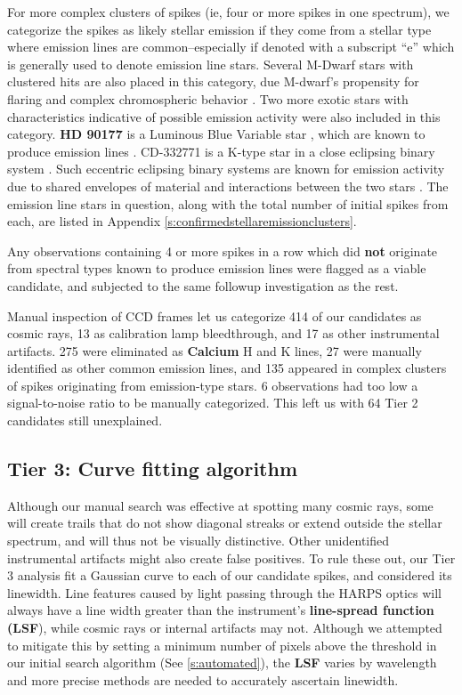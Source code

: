 \documentclass[linenumbers]{aastex701}
\providecommand{\DIFadd}[1]{{\bf #1}} %
\providecommand{\DIFaddbegin}{} %
\providecommand{\DIFaddend}{} %
\begin{document}
For more complex clusters of spikes (ie, four or more spikes in one spectrum), we categorize the spikes as likely stellar emission if they come from a stellar type where emission lines are common--especially if denoted with a subscript  \DIFaddbegin \enquote{e} \DIFaddend which is generally used to denote emission line stars. Several M-Dwarf stars with clustered hits are also placed in this category, due M-dwarf's propensity for flaring and complex chromospheric behavior \citep{ProximaCentauri}. Two more exotic stars with characteristics indicative of possible emission activity were also included in this category.  \DIFaddbegin \DIFadd{HD 90177 }\DIFaddend is a Luminous Blue Variable star \citep{LBV2}, which are known to produce emission lines \citep{LBV}. CD-332771 is a K-type star in a close eclipsing binary system \citep{CD332771EmissionLinesEclipsingBinaries}. Such eccentric eclipsing binary systems are known for emission activity due to shared envelopes of material and interactions between the two stars \citep{eclipsing_binaries}. The emission line stars in question, along with the total number of initial spikes from each, are listed in Appendix \ref{s:confirmedstellaremissionclusters}.

Any observations containing 4 or more spikes in a row which did \textbf{not} originate from spectral types known to produce emission lines were flagged as a viable candidate, and subjected to the same followup investigation as the rest. 

Manual inspection of CCD frames let us categorize 414 of our candidates as cosmic rays, 13 as calibration lamp bleedthrough, and 17 as other instrumental artifacts.  275 were eliminated as \DIFaddbegin \DIFadd{Calcium }\DIFaddend H and K lines, 27 were manually identified as other common emission lines, and 135 appeared in complex clusters of spikes originating from emission-type stars.  6 observations had too low a signal-to-noise ratio to be manually categorized.  This left us with 64 Tier 2 candidates still unexplained.

\subsection{Tier 3:  \DIFaddbegin \DIFadd{Curve fitting }\DIFaddend algorithm}
\label{s:curvefit}

Although our manual search was effective at spotting many cosmic rays, some will create trails that do not show diagonal streaks or extend outside the stellar spectrum, and will thus not be visually distinctive.  Other unidentified instrumental artifacts might also create false positives.  To rule these out, our Tier 3 analysis fit a Gaussian curve to each of our candidate spikes, and considered its linewidth.  Line features caused by light passing through the HARPS optics will always have a line width greater than the instrument's  \DIFaddbegin \DIFadd{line-spread function (LSF}\DIFaddend ), while cosmic rays or internal artifacts may not. Although we attempted to mitigate this by setting a minimum number of pixels above the threshold in our initial search algorithm (See \ref{s:automated}), the  \DIFaddbegin \DIFadd{LSF }\DIFaddend varies by wavelength and more precise methods are needed to accurately ascertain linewidth.
\end{document}
